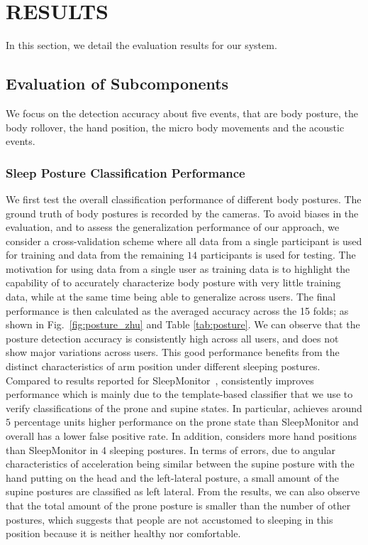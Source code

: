 \section{RESULTS}\label{sec:4experiment}
In this section, we detail the evaluation results for our system.

\subsection{Evaluation of Subcomponents}
We focus on the detection accuracy about five events, that are body posture, the body rollover, the hand position, the micro body movements and the acoustic events.

\subsubsection{Sleep Posture Classification Performance}
\label{subsub:bodyposture}

We first test the overall classification performance of different body postures. The ground truth of body postures is recorded by the cameras. To avoid biases in the evaluation, and to assess the generalization performance of our approach, we consider a cross-validation scheme where all data from a single participant is used for training and data from the remaining $14$ participants is used for testing. The motivation for using data from a single user as training data is to highlight the capability of {\systemname} to accurately characterize body posture with very little training data, while at the same time being able to generalize across users. The final performance is then calculated as the averaged accuracy across the 15 folds; as shown in Fig.~\ref{fig:posture_zhu} and Table \ref{tab:posture}. We can observe that the posture detection accuracy is consistently high across all users, and does not show major variations across users. This good performance benefits from the distinct characteristics of arm position under different sleeping postures. Compared to results reported for SleepMonitor~\cite{sleepmonitor}, {\systemname} consistently improves performance which is mainly due to the template-based classifier that we use to verify classifications of the prone and supine states. In particular, {\systemname} achieves around $5$ percentage units higher performance on the prone state than SleepMonitor and overall has a lower false positive rate. In addition, {\systemname} considers more hand positions than SleepMonitor in 4 sleeping postures. In terms of errors, due to angular characteristics of acceleration being similar between the supine posture with the hand putting on the head and the left-lateral posture, a small amount of the supine postures are classified as left lateral. From the results, we can also observe that the total amount of the prone posture is smaller than the number of other postures, which suggests that people are not accustomed to sleeping in this position because it is neither healthy nor comfortable.

